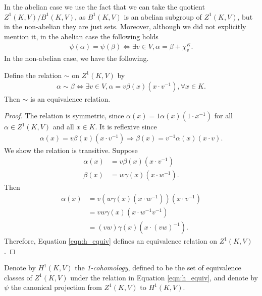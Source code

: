 In the abelian case we use the fact that we can take the quotient $Z^1(K, V)/B^1(K, V)$, as $B^1(K, V)$ is an abelian subgroup of $Z^1(K, V)$, but in the non-abelian they are just sets. Moreover, although we did not explicitly mention it, in the abelian case the following holds
\begin{align*}
	\psi(\alpha) = \psi(\beta) \Leftrightarrow \exists v \in V, \alpha = \beta + \chi^K_v.
\end{align*}
In the non-abelian case, we have the following.

\begin{lemma} Define the relation $\sim$ on $Z^1(K, V)$ by
	\begin{align}
		\alpha \sim \beta \Leftrightarrow \exists v \in V, \alpha = v\beta(x)(x \cdot v^{-1}), \forall x \in K.
		\label{eqn:h_equiv}
	\end{align}
Then $\sim$ is an equivalence relation.
\end{lemma}
\begin{proof}
The relation is symmetric, since $\alpha(x) = 1\alpha(x)(1 \cdot x^{-1})$ for all $\alpha\in Z^1(K, V)$ and all $x \in K$. It is reflexive since
\begin{align*}
	\alpha(x) = v \beta(x)(x \cdot v^{-1}) \Rightarrow \beta(x) = v^{-1}\alpha(x)(x\cdot v).
\end{align*}
We show the relation is transitive. Suppose
\begin{align*}
	\alpha(x) &= v\beta(x)(x\cdot v^{-1}) \\
	\beta(x) &= w\gamma(x)(x\cdot w^{-1}).
\end{align*}
Then
\begin{align*}
	\alpha(x) &= v\left(w \gamma(x)(x\cdot w^{-1})\right)\left(x\cdot v^{-1}\right) \\
		&= vw \gamma(x)\left(x\cdot w^{-1}v^{-1}\right) \\
		&= (vw) \gamma(x)\left(x\cdot (vw)^{-1}\right).
\end{align*}
Therefore, Equation \ref{eqn:h_equiv} defines an equivalence relation on $Z^1(K, V)$.
\end{proof}

\begin{definition}
Denote by $H^1(K, V)$ the \emph{1-cohomology}, defined to be the set of equivalence classes of $Z^1(K, V)$ under the relation in Equation \ref{eqn:h_equiv}, and denote by $\psi$ the canonical projection from $Z^1(K, V)$ to $H^1(K, V)$.
\end{definition}

